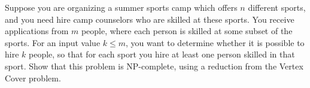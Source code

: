 \problem{}
Suppose you are organizing a summer sports camp which offers $n$ different sports, and you need hire camp counselors who are skilled at these sports.  You receive applications from $m$ people, where each person is skilled at some subset of the sports.  For an input value $k \leq m$, you want to determine whether it is possible to hire $k$ people, so that for each sport you hire at least one person skilled in that sport.  Show that this problem is NP-complete, using a reduction from the Vertex Cover problem.  

\solution{}

\newpage